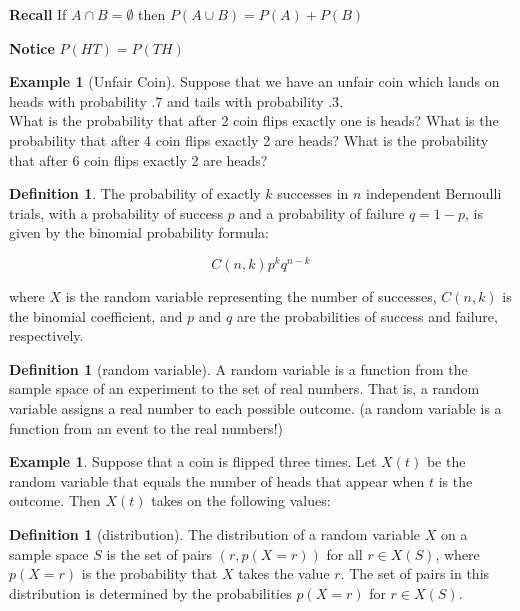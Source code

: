 \documentclass[letterpaper,10pt]{article}
\theoremstyle{plain}
\theoremstyle{definition}
\newtheorem{defn}[thm]{Definition}
\newtheorem{exmp}[thm]{Example}
\theoremstyle{remark}
\begin{document}
\noindent \textbf{Recall} If $A\cap B=\emptyset$ then $P(A \cup B)=P(A)+P(B)$

\noindent \textbf{Notice} $P(HT)=P(TH)$
\begin{exmp}[Unfair Coin]
Suppose that we have an unfair coin which lands on heads with probability $.7$ and tails with probability $.3$.
\\
What is the probability that after 2 coin flips exactly one is heads?
\newline
\vspace{1cm}
\newline
What is the probability that after 4 coin flips exactly 2 are heads?
\newline
\vspace{1cm}
\newline
What is the probability that after 6 coin flips exactly 2 are heads?
\newline
\vspace{1cm}


\end{exmp}
\begin{defn}
The probability of exactly \(k\) successes in \(n\) independent Bernoulli trials, with a probability of success \(p\) and a probability of failure \(q = 1 - p\), is given by the binomial probability formula:

\[
C(n, k) p^k q^{n-k}
\]

where \(X\) is the random variable representing the number of successes, \(C(n, k)\) is the binomial coefficient, and \(p\) and \(q\) are the probabilities of success and failure, respectively.

\end{defn}

\begin{defn}[random variable]
A random variable is a function from the sample space of an experiment to the set of real numbers. That is, a random variable assigns a real number to each possible outcome. (a random variable is a function from an event to the real numbers!)
\end{defn}
\begin{exmp}
Suppose that a coin is flipped three times. Let $X(t)$ be the random variable that equals the
number of heads that appear when $t$ is the outcome. Then $X(t)$ takes on the following values:
\newline
\vspace{2cm}
\end{exmp}


\begin{defn}[distribution]
The distribution of a random variable \(X\) on a sample space \(S\) is the set of pairs \((r, p(X = r))\) for all \(r \in X(S)\), where \(p(X = r)\) is the probability that \(X\) takes the value \(r\). The set of pairs in this distribution is determined by the probabilities \(p(X = r)\) for \(r \in X(S)\).

\end{defn}
\end{document}
